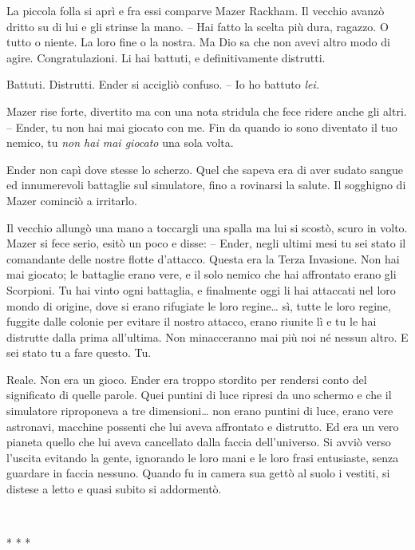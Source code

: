 {La piccola folla si aprì e fra essi comparve Mazer Rackham. Il vecchio
	avanzò dritto su di lui e gli strinse la mano. -- Hai fatto la scelta
	più dura, ragazzo. O tutto o niente. La loro fine o la nostra. Ma Dio sa
	che non avevi altro modo di agire. Congratulazioni. Li hai battuti, e
	definitivamente distrutti.}

{Battuti. Distrutti. Ender si accigliò confuso. -- Io ho battuto
	\emph{lei.}}

{Mazer rise forte, divertito ma con una nota stridula che fece ridere
	anche gli altri. -- Ender, tu non hai mai giocato con me. Fin da quando
	io sono diventato il tuo nemico, tu \emph{non hai mai giocato} una sola
	volta.}

{Ender non capì dove stesse lo scherzo. Quel che sapeva era di aver
	sudato sangue ed innumerevoli battaglie sul simulatore, fino a rovinarsi
	la salute. Il sogghigno di Mazer cominciò a irritarlo.}

{Il vecchio allungò una mano a toccargli una spalla ma lui si scostò,
	scuro in volto. Mazer si fece serio, esitò un poco e disse: -- Ender,
	negli ultimi mesi tu sei stato il comandante delle nostre flotte
	d'attacco. Questa era la Terza Invasione. Non hai mai giocato; le
	battaglie erano vere, e il solo nemico che hai affrontato erano gli
	Scorpioni. Tu hai vinto ogni battaglia, e finalmente oggi li hai
	attaccati nel loro mondo di origine, dove si erano rifugiate le loro
	regine\ldots{} sì, tutte le loro regine, fuggite dalle colonie per
	evitare il nostro attacco, erano riunite lì e tu le hai distrutte dalla
	prima all'ultima. Non minacceranno mai più noi né nessun altro. E sei
	stato tu a fare questo. Tu.}

{Reale. Non era un gioco. Ender era troppo stordito per rendersi conto
	del significato di quelle parole. Quei puntini di luce ripresi da uno
	schermo e che il simulatore riproponeva a tre dimensioni\ldots{} non
	erano puntini di luce, erano vere astronavi, macchine possenti che lui
	aveva affrontato e distrutto. Ed era un vero pianeta quello che lui
	aveva cancellato dalla faccia dell'universo. Si avviò verso l'uscita
	evitando la gente, ignorando le loro mani e le loro frasi entusiaste,
	senza guardare in faccia nessuno. Quando fu in camera sua gettò al suolo
	i vestiti, si distese a letto e quasi subito si addormentò.}

{~}

\begin{center}
	{* * *}
\end{center}

